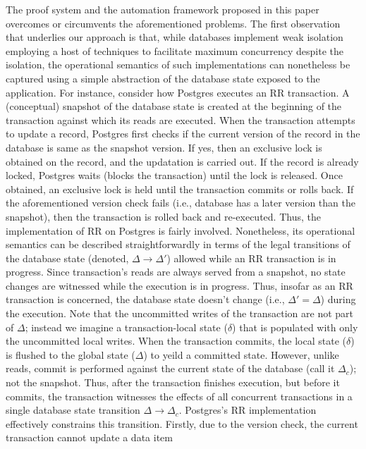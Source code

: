 The proof system and the automation framework proposed in this paper
overcomes or circumvents the aforementioned problems. The first
observation that underlies our approach is that, while databases
implement weak isolation employing a host of techniques to facilitate
maximum concurrency despite the isolation, the operational semantics
of such implementations can nonetheless be captured using a simple
abstraction of the database state exposed to the application. For
instance, consider how Postgres executes an RR transaction. A
(conceptual) snapshot of the database state is created at the
beginning of the transaction against which its reads are executed.
When the transaction attempts to update a record, Postgres first
checks if the current version of the record in the database is same as
the snapshot version. If yes, then an exclusive lock is obtained on
the record, and the updatation is carried out. If the record is
already locked, Postgres waits (blocks the transaction) until the lock
is released. Once obtained, an exclusive lock is held until the
transaction commits or rolls back. If the aforementioned version check
fails (i.e., database has a later version than the snapshot), then the
transaction is rolled back and re-executed. Thus, the implementation
of RR on Postgres is fairly involved. Nonetheless, its operational
semantics can be described straightforwardly in terms of the legal
transitions of the database state (denoted, $\Delta \longrightarrow
\Delta'$) allowed while an RR transaction is in progress. Since
transaction's reads are always served from a snapshot, no state
changes are witnessed while the execution is in progress. Thus,
insofar as an RR transaction is concerned, the database state doesn't
change (i.e., $\Delta' = \Delta$) during the execution. Note that the
uncommitted writes of the transaction are not part of $\Delta$;
instead we imagine a transaction-local state ($\delta$) that is
populated with only the uncommitted local writes. When the transaction
commits, the local state ($\delta$) is flushed to the global state
($\Delta$) to yeild a committed state. However, unlike reads, commit
is performed against the current state of the database (call it
$\Delta_c$); not the snapshot. Thus, after the transaction finishes
execution, but before it commits, the transaction witnesses the
effects of all concurrent transactions in a single database state
transition $\Delta \longrightarrow \Delta_c$. Postgres's RR
implementation effectively constrains this transition. Firstly, due to
the version check, the current transaction cannot update a data item
